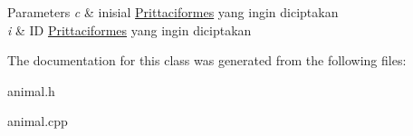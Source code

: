 \begin{DoxyParams}{Parameters}
{\em c} & inisial \hyperlink{classPrittaciformes}{Prittaciformes} yang ingin diciptakan \\
\hline
{\em i} & ID \hyperlink{classPrittaciformes}{Prittaciformes} yang ingin diciptakan \\
\hline
\end{DoxyParams}


The documentation for this class was generated from the following files\+:\begin{DoxyCompactItemize}
\item 
animal.\+h\item 
animal.\+cpp\end{DoxyCompactItemize}
